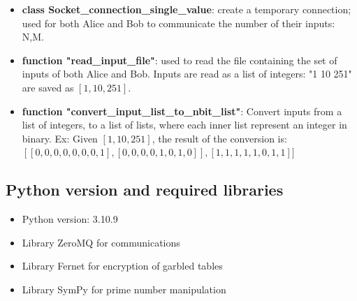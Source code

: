 \documentclass[12pt, letterpaper]{article}
\begin{document}
\begin{itemize}
    \item \textbf{class Socket\_connection\_single\_value}: create a temporary connection; used for both Alice and Bob to communicate the number of their inputs: N,M.
    \item \textbf{function "read\_input\_file"}: used to read the file containing the set of inputs of both Alice and Bob. Inputs are read as a list of integers: "1 10 251" are saved as $[1,10,251]$.
    \item \textbf{function "convert\_input\_list\_to\_nbit\_list"}: Convert inputs from a list of integers, to a list of lists, where each inner list represent an integer in binary. Ex: Given $[1,10,251]$, the result of the conversion is: $[[0,0,0,0,0,0,0,1],[0,0,0,0,1,0,1,0]],[1,1,1,1,1,0,1,1]]$
\end{itemize}
\subsection{Python version and required libraries}
\label{sec:libraries}
\begin{itemize}
    \item Python version: 3.10.9
    \item Library ZeroMQ for communications
    \item Library Fernet for encryption of garbled tables
    \item Library SymPy for prime number manipulation
\end{itemize}
\end{document}
